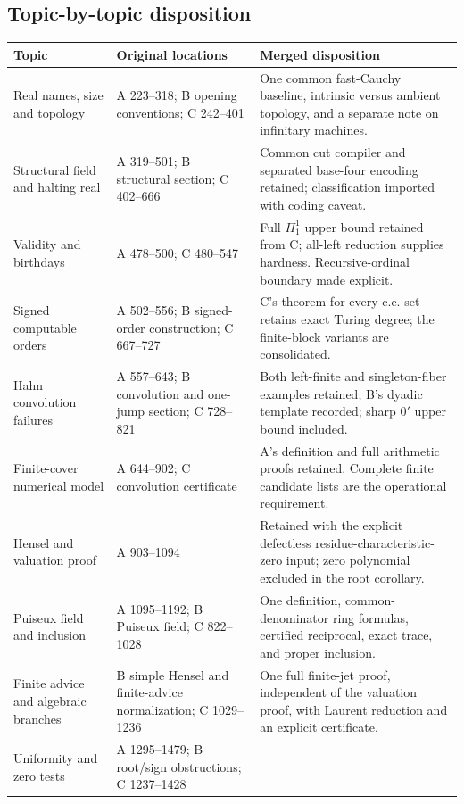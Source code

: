 \documentclass[11pt,letterpaper]{article}
\numberwithin{equation}{section}
\theoremstyle{definition}
\theoremstyle{remark}
\begin{document}
\subsection{Topic-by-topic disposition}
\small
\begin{longtable}{@{}P{.23\textwidth}P{.25\textwidth}P{.44\textwidth}@{}}
\toprule
Topic & Original locations & Merged disposition\\
\midrule
\endhead
Real names, size and topology & A 223--318; B opening conventions; C 242--401 &
One common fast-Cauchy baseline, intrinsic versus ambient topology, and a separate note on infinitary machines.\\
Structural field and halting real & A 319--501; B structural section; C 402--666 &
Common cut compiler and separated base-four encoding retained; classification imported with coding caveat.\\
Validity and birthdays & A 478--500; C 480--547 &
Full $\Pi^1_1$ upper bound retained from C; all-left reduction supplies hardness. Recursive-ordinal boundary made explicit.\\
Signed computable orders & A 502--556; B signed-order construction; C 667--727 &
C's theorem for every c.e. set retains exact Turing degree; the finite-block variants are consolidated.\\
Hahn convolution failures & A 557--643; B convolution and one-jump section; C 728--821 &
Both left-finite and singleton-fiber examples retained; B's dyadic template recorded; sharp $0'$ upper bound included.\\
Finite-cover numerical model & A 644--902; C convolution certificate &
A's definition and full arithmetic proofs retained. Complete finite candidate lists are the operational requirement.\\
Hensel and valuation proof & A 903--1094 &
Retained with the explicit defectless residue-characteristic-zero input; zero polynomial excluded in the root corollary.\\
Puiseux field and inclusion & A 1095--1192; B Puiseux field; C 822--1028 &
One definition, common-denominator ring formulas, certified reciprocal, exact trace, and proper inclusion.\\
Finite advice and algebraic branches & B simple Hensel and finite-advice normalization; C 1029--1236 &
One full finite-jet proof, independent of the valuation proof, with Laurent reduction and an explicit certificate.\\
Uniformity and zero tests & A 1295--1479; B root/sign obstructions; C 1237--1428 &

\end{longtable}
\end{document}
